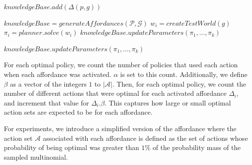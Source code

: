 \documentclass[conference]{IEEEtran}
\begin{document}
\begin{algorithm}
  \caption{$generateAffordances(\mathcal{P}, \mathcal{G})$}
  \begin{algorithmic}[1]
    \State $knowledgeBase.add(\Delta(p,g))$
    \EndFor
    \EndFor
  \end{algorithmic}
  \label{alg:gen_affs}
\end{algorithm}

\begin{algorithm}
  \caption{$learn(\mathcal{P}, \mathcal{G})$}

  \begin{algorithmic}[1]
    \State $knowledgeBase = generateAffordances(\mathcal{P}, \mathcal{G})$
    \State $w_i = createTestWorld(g)$
    \State $\pi_i = planner.solve(w_i)$
    \EndFor
    \State $knowledgeBase.updateParameters(\pi_1, \ldots, \pi_k)$
  \end{algorithmic}
  \label{alg:learn}
\end{algorithm}

\begin{algorithm}
  \caption{$updateParameters(\pi_1, \ldots, \pi_k)$}
  \begin{algorithmic}[1]
    \State 
    \EndIf
    \EndFor
    \EndFor
    \EndFor
    \State $knowledgeBase.updateParameters(\pi_1, \ldots, \pi_k)$
  \end{algorithmic}
  \label{alg:learn}
\end{algorithm}


For each optimal policy, we count the number of policies that used
each action when each affordance was activated. $\alpha$ is set to
this count. Additionally, we define $\beta$ as a vector of the
integers $1$ to $|\mathcal{A}|$.  Then, for each optimal policy, we
count the number of different actions that were optimal for each
activated affordance $\Delta_i$, and increment that value for
$\Delta_i.\beta$. This captures how large or small optimal action sets
are expected to be for each affordance.

For experiments, we introduce a simplified version of the affordance where
the action set $\mathcal{A}$ associated with each affordance is defined
as the set of actions whose probability of being optimal was greater than $1\%$
of the probability mass of the sampled multinomial.
\end{document}
